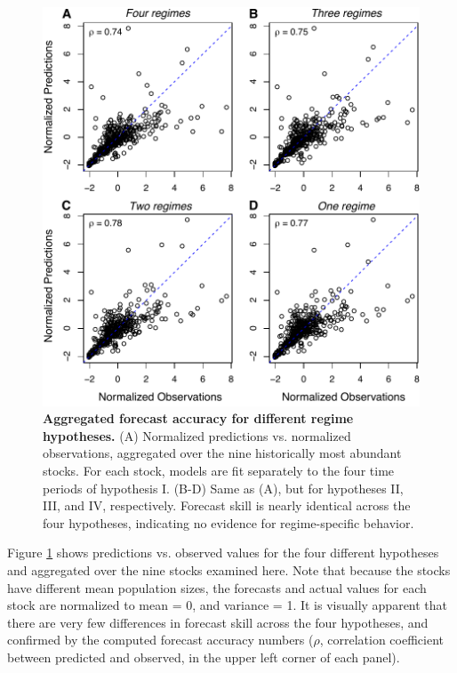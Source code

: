 \begin{figure}[!ht]
\begin{center}\includegraphics[width=\maxwidth{\textwidth}]{fig_regimes_1.pdf}\end{center}
\caption[Aggregated forecast accuracy for different regime hypotheses.]{\textbf{Aggregated forecast accuracy for different regime hypotheses.}\newline
(A) Normalized predictions vs. normalized observations, aggregated over the nine historically most abundant stocks. For each stock, models are fit separately to the four time periods of hypothesis I. (B-D) Same as (A), but for hypotheses II, III, and IV, respectively. Forecast skill is nearly identical across the four hypotheses, indicating no evidence for regime-specific behavior.}
\label{fig_regimes_aggregated_forecast_skill}
\end{figure}

Figure \ref{fig_regimes_aggregated_forecast_skill} shows predictions vs. observed values for the four different hypotheses and aggregated over the nine stocks examined here. Note that because the stocks have different mean population sizes, the forecasts and actual values for each stock are normalized to mean = 0, and variance = 1. It is visually apparent that there are very few differences in forecast skill across the four hypotheses, and confirmed by the computed forecast accuracy numbers ($\rho$, correlation coefficient between predicted and observed, in the upper left corner of each panel).

